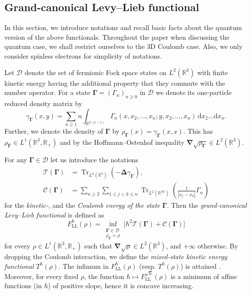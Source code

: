 \documentclass[final,onefignum,onetabnum,reqno]{amsart}
\theoremstyle{remark}
\renewcommand{\le}{\leqslant}
\renewcommand{\ge}{\geqslant}
\DeclareMathOperator{\Tr}{Tr}
\newcommand{\RR}{\mathbb{R}}
\newcommand{\vGamma}{{\bm{\Gamma}}} %
\newcommand{\LL}{\mathrm{LL}} %
\newcommand{\lapl}{\bm{\Delta}} %
\newcommand{\grad}{\bm{\nabla}} %
\newcommand{\dd}{\mathrm{d}} %
\newcommand{\dm}{\mathcal{D}} %
\newcommand{\TC}{\mathcal{T}}
\newcommand{\Cc}{\mathcal{C}}
\begin{document}
\subsection{Grand-canonical Levy--Lieb functional}
In this section, we introduce notations and recall basic facts about the quantum version of the above functionals. Throughout the paper when discussing the quantum case, we shall restrict ourselves to the 3D Coulomb case.
Also, we only consider spinless electrons for simplicity of notations. 

Let $\dm$ denote the set of fermionic Fock space states on $L^2(\RR^3)$ with finite kinetic energy having the additional property that they commute with the number operator. For a state $\vGamma=(\Gamma_n)_{n\ge 0}$ in $\dm$ we denote its one-particle reduced density matrix by
$$
\gamma_\vGamma(x,y)=\sum_{n\ge 1} n \int_{\RR^{3(n-1)}} \Gamma_n(x,x_2,\ldots,x_n;y,x_2,\ldots,x_n)\,\dd x_2\ldots \dd x_n.
$$
Further, we denote the density of $\vGamma$ by $\rho_\vGamma(x)=\gamma_\vGamma(x,x)$. This
has $\rho_\vGamma\in L^1(\RR^3,\RR_+)$ and 
by the Hoffmann--Ostenhof inequality $\grad\sqrt{\rho_\vGamma}\in L^2(\RR^3)$. 

For any $\vGamma\in\dm$ let us introduce the notations
\begin{equation*}
\begin{aligned}
\TC(\vGamma)
&= \Tr_{L^2(\RR^3)} (-\lapl \gamma_\vGamma), \\ 
\Cc(\vGamma) &=\sum_{n\ge 2}\sum_{1\le j<k\le n} \Tr_{L^2(\RR^{3n})}\left( \frac{1}{|x_j-x_k|} \Gamma_n \right)
\end{aligned}
\end{equation*}
for the \emph{kinetic-}, and the \emph{Coulomb energy of the state} $\vGamma$. Then the \emph{grand-canonical Levy--Lieb functional} is defined as
$$
F_\LL^\hbar(\rho)=\inf_{\substack{\vGamma\in\dm\\\rho_\vGamma=\rho}} \Big[ \hbar^2\TC(\vGamma) + \Cc(\vGamma) \Big]
$$
for every $\rho\in L^1(\RR^3,\RR_+)$ such that $\grad\sqrt{\rho}\in L^2(\RR^3)$, and $+\infty$ otherwise. By dropping the Coulomb interaction, we define the \emph{mixed-state kinetic energy functional} $T^\hbar(\rho)$.
The infimum in $F_\LL^\hbar(\rho)$ (resp. $T^\hbar(\rho)$) is attained \cite{lewin2019universal}. Moreover, for every fixed $\rho$, the function $\hbar\mapsto F_\LL^{\sqrt{\hbar}}(\rho)$ is a minimum of affine functions (in $\hbar$) of positive slope, hence it is concave increasing.
\end{document}
